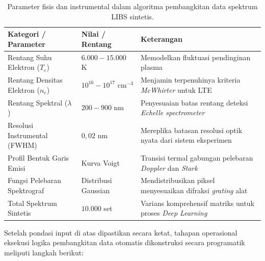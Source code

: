\documentclass[12pt, a4paper]{article}
\begin{document}
\begin{table}[H]
\centering
\caption{Parameter fisis dan instrumental dalam algoritma pembangkitan data spektrum LIBS sintetis.}
\label{tab:parameter-simulasi}
\small
\begin{tabular}{llp{5.5cm}}
\toprule
\textbf{Kategori / Parameter} & \textbf{Nilai / Rentang} & \textbf{Keterangan} \\
\midrule
Rentang Suhu Elektron ($T_e$) & $6.000 - 15.000$ K & Memodelkan fluktuasi pendinginan plasma \citep{cristoforetti2010} \\
Rentang Densitas Elektron ($n_e$) & $10^{16} - 10^{17}$ cm$^{-3}$ & Menjamin terpenuhinya kriteria \textit{McWhirter} untuk LTE \\
Rentang Spektral ($\lambda$) & $200 - 900$ nm & Penyesuaian batas rentang deteksi \textit{Echelle spectrometer} \\
Resolusi Instrumental (FWHM) & $0{,}02$ nm & Mereplika batasan resolusi optik nyata dari sistem eksperimen \\
Profil Bentuk Garis Emisi & Kurva Voigt & Transisi termal gabungan pelebaran \textit{Doppler} dan \textit{Stark} \\
Fungsi Pelebaran Spektrograf & Distribusi Gaussian & Mendistribusikan piksel menyesuaikan difraksi \textit{grating} alat \\
Total Spektrum Sintetis & $10.000$ set & Varians komprehensif matriks untuk proses \textit{Deep Learning} \\
\bottomrule
\end{tabular}
\end{table}

Setelah pondasi input di atas dipastikan secara ketat, tahapan operasional eksekusi logika pembangkitan data otomatis dikonstruksi secara programatik meliputi langkah berikut:
\end{document}
